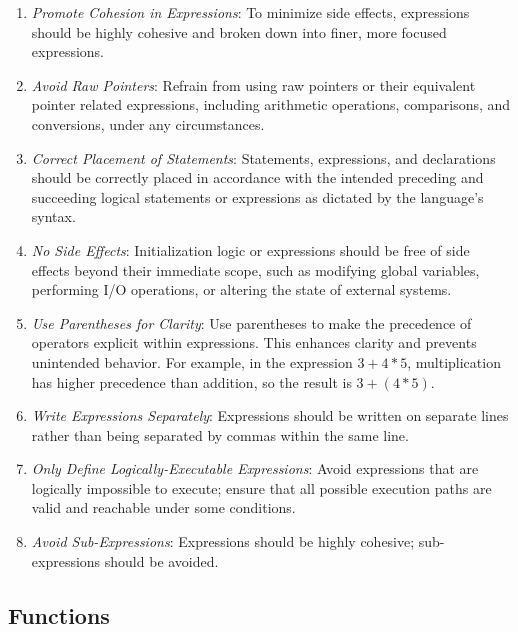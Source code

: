 \documentclass[9pt]{IEEEtran} %
\begin{document}
\begin{enumerate}
  \item \textit{Promote Cohesion in Expressions}: To minimize side effects, expressions should be highly cohesive and broken down into finer, more focused expressions.
  \item \textit{Avoid Raw Pointers}: Refrain from using raw pointers or their equivalent pointer related expressions, including arithmetic operations, comparisons, and conversions, under any circumstances.
  \item \textit{Correct Placement of Statements}: Statements, expressions, and declarations should be correctly placed in accordance with the intended preceding and succeeding logical statements or expressions as dictated by the language’s syntax.
  \item \textit{No Side Effects}: Initialization logic or expressions should be free of side effects beyond their immediate scope, such as modifying global variables, performing I/O operations, or altering the state of external systems.
  \item \textit{Use Parentheses for Clarity}: Use parentheses to make the precedence of operators explicit within expressions. This enhances clarity and prevents unintended behavior. For example, in the expression $3 + 4 * 5$, multiplication has higher precedence than addition, so the result is $3 + (4 * 5)$.
  \item \textit{Write Expressions Separately}: Expressions should be written on separate lines rather than being separated by commas within the same line.
  \item \textit{Only Define Logically-Executable Expressions}: Avoid expressions that are logically impossible to execute; ensure that all possible execution paths are valid and reachable under some conditions.
  \item \textit{Avoid Sub-Expressions}: Expressions should be highly cohesive; sub-expressions should be avoided.
\end{enumerate}

\subsection{Functions}
\label{ESSFunctions}
\end{document}
